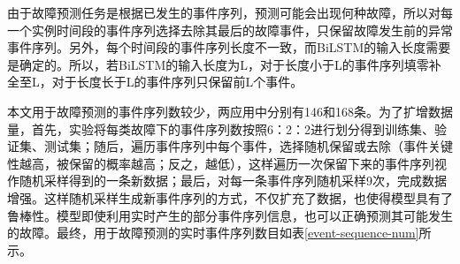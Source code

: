 由于故障预测任务是根据已发生的事件序列，预测可能会出现何种故障，所以对每一个实例时间段的事件序列选择去除其最后的故障事件，只保留故障发生前的异常事件序列。另外，每个时间段的事件序列长度不一致，而BiLSTM的输入长度需要是确定的。所以，若BiLSTM的输入长度为L，对于长度小于L的事件序列填零补全至L，对于长度长于L的事件序列只保留前L个事件。

本文用于故障预测的事件序列数较少，两应用中分别有146和168条。为了扩增数据量，首先，实验将每类故障下的事件序列数按照6：2：2进行划分得到训练集、验证集、测试集；随后，遍历事件序列中每个事件，选择随机保留或去除（事件关键性越高，被保留的概率越高；反之，越低），这样遍历一次保留下来的事件序列视作随机采样得到的一条新数据；最后，对每一条事件序列随机采样9次，完成数据增强。这样随机采样生成新事件序列的方式，不仅扩充了数据，也使得模型具有了鲁棒性。模型即使利用实时产生的部分事件序列信息，也可以正确预测其可能发生的故障。最终，用于故障预测的实时事件序列数目如表\ref{event-sequence-num}所示。
